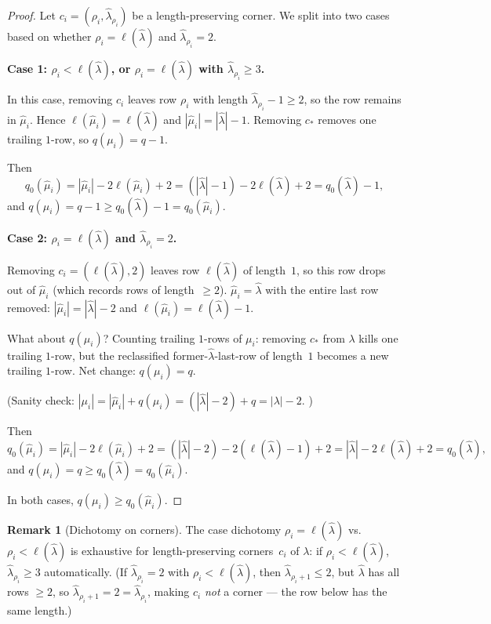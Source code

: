 \documentclass[11pt]{article}
\theoremstyle{definition}
\newtheorem{remark}[theorem]{Remark}
\begin{document}
\begin{proof}
Let $c_i = (\rho_i, \hat\lambda_{\rho_i})$ be a length-preserving
corner. We split into two cases based on whether $\rho_i = \ell(\hat\lambda)$
and $\hat\lambda_{\rho_i} = 2$.

\textbf{Case 1: $\rho_i < \ell(\hat\lambda)$, or $\rho_i = \ell(\hat\lambda)$
with $\hat\lambda_{\rho_i} \ge 3$.}

In this case, removing $c_i$ leaves row $\rho_i$ with length
$\hat\lambda_{\rho_i} - 1 \ge 2$, so the row remains in $\hat\mu_i$.
Hence $\ell(\hat\mu_i) = \ell(\hat\lambda)$ and $|\hat\mu_i| = |\hat\lambda| - 1$.
Removing $c_*$ removes one trailing $1$-row, so $q(\mu_i) = q - 1$.

Then
\[
   q_0(\hat\mu_i) = |\hat\mu_i| - 2\ell(\hat\mu_i) + 2
   = (|\hat\lambda| - 1) - 2\ell(\hat\lambda) + 2
   = q_0(\hat\lambda) - 1,
\]
and $q(\mu_i) = q - 1 \ge q_0(\hat\lambda) - 1 = q_0(\hat\mu_i)$. \checkmark

\textbf{Case 2: $\rho_i = \ell(\hat\lambda)$ and $\hat\lambda_{\rho_i} = 2$.}

Removing $c_i = (\ell(\hat\lambda), 2)$ leaves row $\ell(\hat\lambda)$
of length~$1$, so this row drops out of $\hat\mu_i$ (which records
rows of length~$\ge 2$). $\hat\mu_i = \hat\lambda$ with the entire
last row removed: $|\hat\mu_i| = |\hat\lambda| - 2$ and
$\ell(\hat\mu_i) = \ell(\hat\lambda) - 1$.

What about $q(\mu_i)$? Counting trailing $1$-rows of $\mu_i$: removing
$c_*$ from $\lambda$ kills one trailing $1$-row, but the reclassified
former-$\hat\lambda$-last-row of length~$1$ becomes a new trailing
$1$-row. Net change: $q(\mu_i) = q$.

(Sanity check: $|\mu_i| = |\hat\mu_i| + q(\mu_i) = (|\hat\lambda| - 2) + q
= |\lambda| - 2$. \checkmark)

Then
\[
   q_0(\hat\mu_i) = |\hat\mu_i| - 2\ell(\hat\mu_i) + 2
   = (|\hat\lambda| - 2) - 2(\ell(\hat\lambda) - 1) + 2
   = |\hat\lambda| - 2\ell(\hat\lambda) + 2
   = q_0(\hat\lambda),
\]
and $q(\mu_i) = q \ge q_0(\hat\lambda) = q_0(\hat\mu_i)$. \checkmark

In both cases, $q(\mu_i) \ge q_0(\hat\mu_i)$.
\end{proof}

\begin{remark}[Dichotomy on corners]\label{rem:dichotomy}
The case dichotomy
$\rho_i = \ell(\hat\lambda)$ vs.\ $\rho_i < \ell(\hat\lambda)$ is
exhaustive for length-preserving corners~$c_i$ of $\lambda$: if
$\rho_i < \ell(\hat\lambda)$, $\hat\lambda_{\rho_i} \ge 3$
automatically. (If $\hat\lambda_{\rho_i} = 2$ with
$\rho_i < \ell(\hat\lambda)$, then $\hat\lambda_{\rho_i+1} \le 2$, but
$\hat\lambda$ has all rows $\ge 2$, so $\hat\lambda_{\rho_i+1} = 2 =
\hat\lambda_{\rho_i}$, making $c_i$ \emph{not} a corner --- the row
below has the same length.)
\end{remark}
\end{document}
